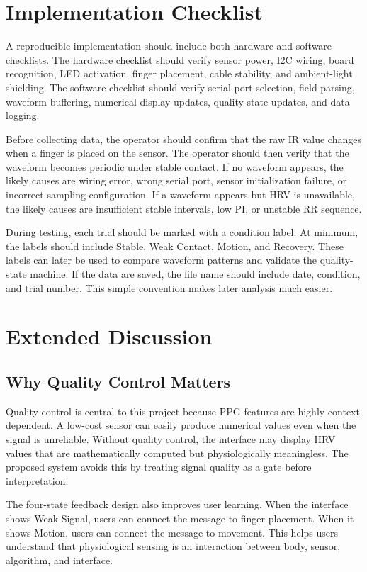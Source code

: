 \documentclass[10pt,conference]{IEEEtran}
\begin{document}
\section{Implementation Checklist}
A reproducible implementation should include both hardware and software checklists. The hardware checklist should verify sensor power, I2C wiring, board recognition, LED activation, finger placement, cable stability, and ambient-light shielding. The software checklist should verify serial-port selection, field parsing, waveform buffering, numerical display updates, quality-state updates, and data logging.

Before collecting data, the operator should confirm that the raw IR value changes when a finger is placed on the sensor. The operator should then verify that the waveform becomes periodic under stable contact. If no waveform appears, the likely causes are wiring error, wrong serial port, sensor initialization failure, or incorrect sampling configuration. If a waveform appears but HRV is unavailable, the likely causes are insufficient stable intervals, low PI, or unstable RR sequence.

During testing, each trial should be marked with a condition label. At minimum, the labels should include Stable, Weak Contact, Motion, and Recovery. These labels can later be used to compare waveform patterns and validate the quality-state machine. If the data are saved, the file name should include date, condition, and trial number. This simple convention makes later analysis much easier.

\section{Extended Discussion}
\subsection{Why Quality Control Matters}
Quality control is central to this project because PPG features are highly context dependent. A low-cost sensor can easily produce numerical values even when the signal is unreliable. Without quality control, the interface may display HRV values that are mathematically computed but physiologically meaningless. The proposed system avoids this by treating signal quality as a gate before interpretation.

The four-state feedback design also improves user learning. When the interface shows Weak Signal, users can connect the message to finger placement. When it shows Motion, users can connect the message to movement. This helps users understand that physiological sensing is an interaction between body, sensor, algorithm, and interface.
\end{document}
